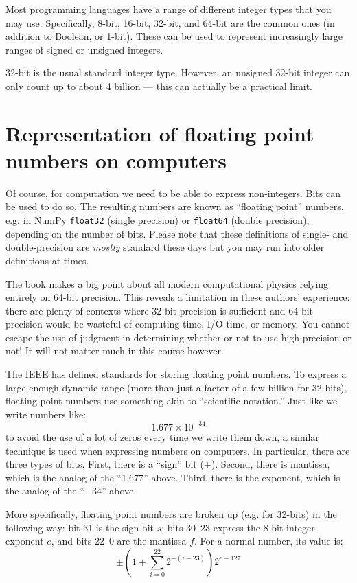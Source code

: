 Most programming languages have a range of different integer types
that you may use. Specifically, 8-bit, 16-bit, 32-bit, and 64-bit are
the common ones (in addition to Boolean, or 1-bit).  These can be used
to represent increasingly large ranges of signed or unsigned integers.

32-bit is the usual standard integer type. However, an unsigned 32-bit
integer can only count up to about 4 billion --- this can actually be
a practical limit. 

\section{Representation of floating point numbers on computers}

Of course, for computation we need to be able to express
non-integers. Bits can be used to do so. The resulting numbers are
known as ``floating point'' numbers, e.g. in NumPy {\tt float32}
(single precision) or {\tt float64} (double precision), depending on
the number of bits. Please note that these definitions of single- and
double-precision are {\it mostly} standard these days but you may run
into older definitions at times.

The book makes a big point about all modern computational physics
relying entirely on 64-bit precision. This reveals a limitation in
these authors' experience: there are plenty of contexts where 32-bit
precision is sufficient and 64-bit precision would be wasteful of
computing time, I/O time, or memory. You cannot escape the use of
judgment in determining whether or not to use high precision or not!
It will not matter much in this course however.

The IEEE has defined standards for storing floating point numbers.  To
express a large enough dynamic range (more than just a factor of a few
billion for 32 bits), floating point numbers use something akin to
``scientific notation.'' Just like we write numbers like:
\begin{equation}
1.677 \times 10^{-34}
\end{equation}
to avoid the use of a lot of zeros every time we write them down, a
similar technique is used when expressing numbers on computers. In
particular, there are three types of bits. First, there is a ``sign''
bit ($\pm$). Second, there is mantissa, which is the analog of the
``1.677'' above. Third, there is the exponent, which is the analog of
the ``$-34$'' above.

More specifically, floating point numbers are broken up (e.g. for
32-bits) in the following way: bit 31 is the sign bit $s$; bits 30--23
express the 8-bit integer exponent $e$, and bits 22--0 are the
mantissa $f$. For a normal number, its value is:
\begin{equation}
\pm \left(1 + \sum_{i=0}^{22} 2^{-(i-23)} \right) 2^{e-127}
\end{equation}

